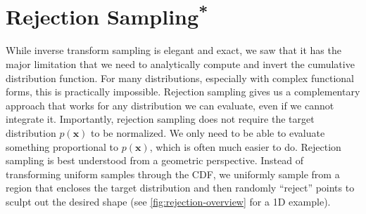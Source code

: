 \section{\texorpdfstring{Rejection Sampling\textsuperscript{*}}{Rejection Sampling}}
While inverse transform sampling is elegant and exact, we saw that it has the major limitation that we need to analytically compute and invert the cumulative distribution function. For many distributions, especially with complex functional forms, this is practically impossible. Rejection sampling gives us a complementary approach that works for any distribution we can evaluate, even if we cannot integrate it. Importantly, rejection sampling does not require the target distribution $p(\mathbf{x})$ to be normalized. We only need to be able to evaluate something proportional to $p(\mathbf{x})$, which is often much easier to do. Rejection sampling is best understood from a geometric perspective. Instead of transforming uniform samples through the CDF, we uniformly sample from a region that encloses the target distribution and then randomly ``reject'' points to sculpt out the desired shape (see \autoref{fig:rejection-overview} for a 1D example).

